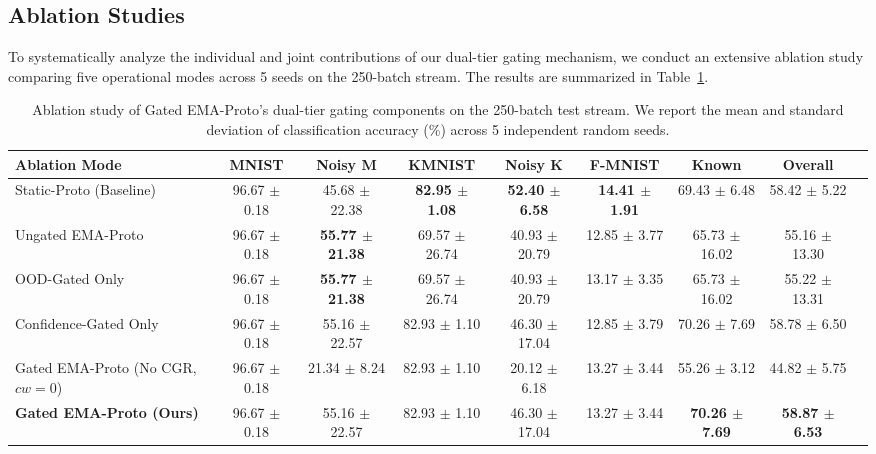 \documentclass{article}
\theoremstyle{plain}
\theoremstyle{definition}
\theoremstyle{remark}
\begin{document}
\subsection{Ablation Studies}
To systematically analyze the individual and joint contributions of our dual-tier gating mechanism, we conduct an extensive ablation study comparing five operational modes across 5 seeds on the 250-batch stream. The results are summarized in Table~\ref{tab:ablation}.

\begin{table}[t]
\caption{Ablation study of Gated EMA-Proto's dual-tier gating components on the 250-batch test stream. We report the mean and standard deviation of classification accuracy (\%) across 5 independent random seeds.}
\label{tab:ablation}
\vskip 0.15in
\begin{center}
\begin{scriptsize}
\begin{sc}
\setlength{\tabcolsep}{1.0pt}
\begin{tabular}{lcccccccc}
\toprule
Ablation Mode & MNIST & Noisy M & KMNIST & Noisy K & F-MNIST & Known & Overall \\
\midrule
Static-Proto (Baseline) & 96.67 $\pm$ 0.18 & 45.68 $\pm$ 22.38 & \textbf{82.95 $\pm$ 1.08} & \textbf{52.40 $\pm$ 6.58} & \textbf{14.41 $\pm$ 1.91} & 69.43 $\pm$ 6.48 & 58.42 $\pm$ 5.22 \\
Ungated EMA-Proto & 96.67 $\pm$ 0.18 & \textbf{55.77 $\pm$ 21.38} & 69.57 $\pm$ 26.74 & 40.93 $\pm$ 20.79 & 12.85 $\pm$ 3.77 & 65.73 $\pm$ 16.02 & 55.16 $\pm$ 13.30 \\
OOD-Gated Only & 96.67 $\pm$ 0.18 & \textbf{55.77 $\pm$ 21.38} & 69.57 $\pm$ 26.74 & 40.93 $\pm$ 20.79 & 13.17 $\pm$ 3.35 & 65.73 $\pm$ 16.02 & 55.22 $\pm$ 13.31 \\
Confidence-Gated Only & 96.67 $\pm$ 0.18 & 55.16 $\pm$ 22.57 & 82.93 $\pm$ 1.10 & 46.30 $\pm$ 17.04 & 12.85 $\pm$ 3.79 & 70.26 $\pm$ 7.69 & 58.78 $\pm$ 6.50 \\
Gated EMA-Proto (No CGR, $cw=0$) & 96.67 $\pm$ 0.18 & 21.34 $\pm$ 8.24 & 82.93 $\pm$ 1.10 & 20.12 $\pm$ 6.18 & 13.27 $\pm$ 3.44 & 55.26 $\pm$ 3.12 & 44.82 $\pm$ 5.75 \\
\textbf{Gated EMA-Proto (Ours)} & 96.67 $\pm$ 0.18 & 55.16 $\pm$ 22.57 & 82.93 $\pm$ 1.10 & 46.30 $\pm$ 17.04 & 13.27 $\pm$ 3.44 & \textbf{70.26 $\pm$ 7.69} & \textbf{58.87 $\pm$ 6.53} \\
\bottomrule
\end{tabular}
\end{sc}
\end{scriptsize}
\end{center}
\vskip -0.1in
\end{table}
\end{document}

